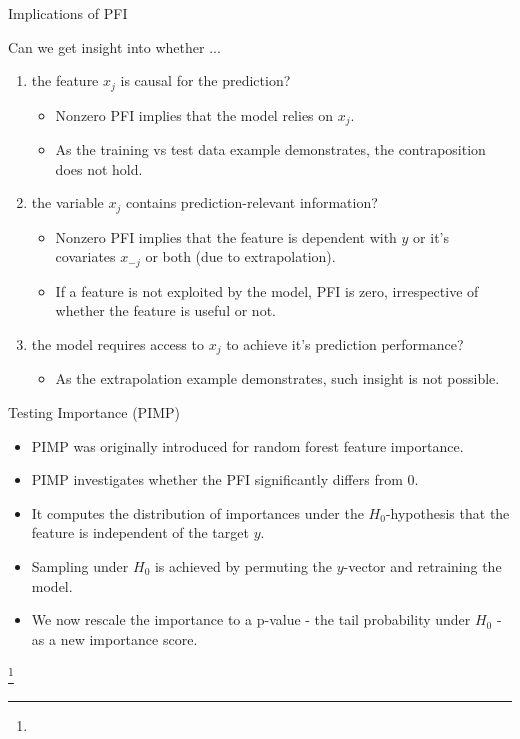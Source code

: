 \documentclass[11pt,compress,t,notes=noshow, xcolor=table]{beamer}
\begin{document}
\begin{vbframe}{Implications of PFI}

Can we get insight into whether ...

\begin{enumerate}
    \item the feature $x_j$ is causal for the prediction?
    \begin{itemize}
      \item Nonzero PFI implies that the model relies on $x_j$.
      \item As the training vs test data example demonstrates, the contraposition does not hold.
    \end{itemize}
    \item the variable $x_j$ contains prediction-relevant information?
    \begin{itemize}
      \item Nonzero PFI implies that the feature is dependent with $y$ or it's covariates $x_{-j}$ or both (due to extrapolation).
      \item If a feature is not exploited by the model, PFI is zero, irrespective of whether the feature is useful or not.
    \end{itemize}
    \item the model requires access to $x_j$ to achieve it's prediction performance?    
    \begin{itemize}
      \item As the extrapolation example demonstrates, such insight is not possible.
\end{itemize}
\end{enumerate}
\end{vbframe}


\begin{vbframe}{Testing Importance (PIMP)}

\begin{itemize}
  \item PIMP was originally introduced for random forest feature importance.
  \item PIMP investigates whether the PFI significantly differs from 0. 
  \item It computes the distribution of importances under the $H_0$-hypothesis that the feature is independent of the target $y$.
  \item Sampling under $H_0$ is achieved by permuting the $y$-vector and retraining the model.
  \item We now rescale the importance to a p-value - the tail probability under $H_0$ - as a new importance score.
\end{itemize}

\footnote[frame]{}

\end{vbframe}
\end{document}
